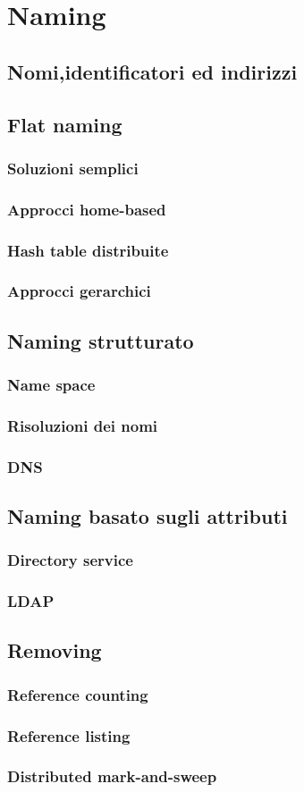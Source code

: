 \section{Naming}\label{capitolo6}
\subsection{Nomi,identificatori ed indirizzi}
\subsection{Flat naming}
\subsubsection{Soluzioni semplici}
\subsubsection{Approcci home-based}
\subsubsection{Hash table distribuite}
\subsubsection{Approcci gerarchici}
\subsection{Naming strutturato}
\subsubsection{Name space}
\subsubsection{Risoluzioni dei nomi}
\subsubsection{DNS}
\subsection{Naming basato sugli attributi}
\subsubsection{Directory service}
\subsubsection{LDAP}
\subsection{Removing}
\subsubsection{Reference counting}
\subsubsection{Reference listing}
\subsubsection{Distributed mark-and-sweep}